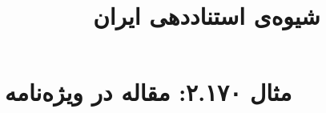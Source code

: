 \documentclass[a4paper,10pt]{article}
\begin{document}
\title{شیوه‌ی استناددهی ایران
 }
\author{}
\date{}
\maketitle



\section*{مثال ۲.۱۷۰: مقاله در ویژه‌نامه}

\cite{فتاحی1383}\\
\cite{whittington1991}\\






\end{document}
